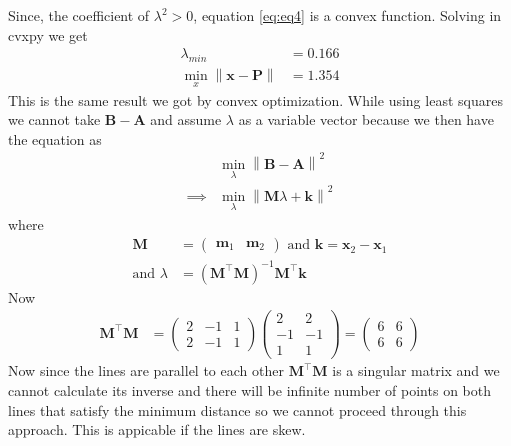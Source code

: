 \documentclass[12pt]{article}
\providecommand{\brak}[1]{\ensuremath{\left(#1\right)}}
\providecommand{\norm}[1]{\left\lVert#1\right\rVert}
\newcommand{\myvec}[1]{\ensuremath{\begin{pmatrix}#1\end{pmatrix}}}
\let\vec\mathbf
\begin{document}
Since, the coefficient of $\lambda^2>0$, equation \eqref{eq:eq4} is a convex function. Solving in cvxpy we get
\begin{align}
	\lambda_{min} &= 0.166\\
	\min_{x}\norm{\vec{x}-\vec{P}} &= 1.354
\end{align}
This is the same result we got by convex optimization. While using least squares we cannot take $\vec{B}-\vec{A}$ and assume $\lambda$ as a variable vector because we then have the equation as
\begin{align}
	&\min_{\lambda}\norm{\vec{B}-\vec{A}}^2\\
	\implies &\min_{\lambda}\norm{\vec{M}\lambda+\vec{k}}^2
\end{align}
where
\begin{align}
	\vec{M} &= \myvec{\vec{m}_1 & \vec{m}_2} \text{ and } \vec{k} = \vec{x}_2 - \vec{x}_1\\
	\text{and } \lambda &= \brak{\vec{M}^\top\vec{M}}^{-1}\vec{M}^\top\vec{k}
\end{align}
Now
\begin{align}
	\vec{M}^\top\vec{M} &= \myvec{2&-1&1\\2&-1&1}\myvec{2&2\\-1&-1\\1&1} = \myvec{6&6\\6&6} 
\end{align}
Now since the lines are parallel to each other $\vec{M}^\top\vec{M}$ is a singular matrix and we cannot calculate its inverse and there will be infinite number of points on both lines that satisfy the minimum distance so we cannot proceed through this approach. This is appicable if the lines are skew.
\end{document}

